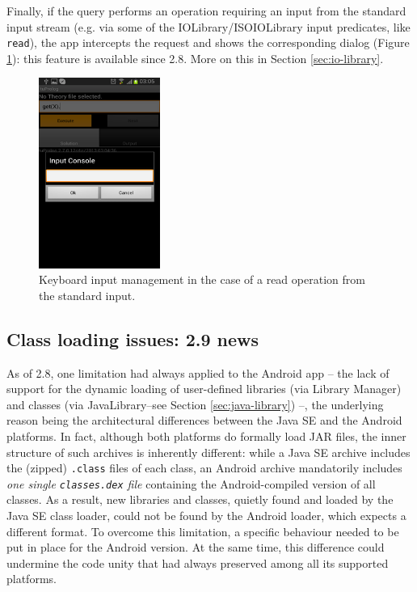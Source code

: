 Finally, if the query performs an operation requiring an input from the standard input stream (e.g. via some of the IOLibrary/ISOIOLibrary input predicates, like \texttt{read}), the app intercepts the request and shows the corresponding dialog (Figure \ref{fig:android9}): this feature is available since \tuprolog{} 2.8.
More on this in Section \ref{sec:io-library}.

\begin{figure}
\centering
  \includegraphics[width=150px]{images/android9.png}
  \caption{Keyboard input management in the case of a read operation from the standard input.}\label{fig:android9}
\end{figure}

\subsection{Class loading issues: \tuprolog{} 2.9 news}
\label{ssec:android-classloading-issues}

As of \tuprolog{} 2.8, one limitation had always applied to the Android app -- the lack of support for the dynamic loading of user-defined libraries (via Library Manager) and classes (via JavaLibrary--see Section \ref{sec:java-library}) --, the underlying reason being the architectural differences between the Java SE and the Android platforms.
In fact, although both platforms do formally load JAR files, the inner structure of such archives is inherently different: while a Java SE archive includes the (zipped) \texttt{.class} files of each class, an Android archive mandatorily includes \textit{one single \texttt{classes.dex} file} containing the Android-compiled version of all classes.
As a result, new libraries and classes, quietly found and loaded by the Java SE class loader, could not be found by the Android loader, which expects a different format.
To overcome this limitation, a specific behaviour needed to be put in place for the Android version. At the same time, this difference could undermine the code unity that \tuprolog{} had always preserved among all its supported platforms.


